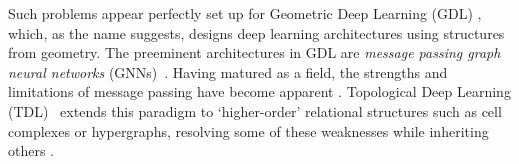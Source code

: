 \documentclass{article}
\newcommand{\jake}[1]{}
\newcommand{\kelly}[1]{}
\theoremstyle{remark}
\theoremstyle{plain}
\begin{document}

 Such problems appear perfectly set up for Geometric Deep Learning (GDL) \cite{bronstein2021geometric}, which, as the name suggests, designs deep learning architectures using structures from geometry. The preeminent architectures in GDL are \textit{message passing graph neural networks} (GNNs)~\cite{gilmer2017neural, battaglia2018relational, hamilton2018inductiverepresentationlearninglarge, thomas2019kpconv, xu2018how, velickovic2018graph, dwivedi2021generalizationtransformernetworksgraphs}. Having matured as a field, the strengths and limitations of message passing have become apparent \cite{garg2020generalizationrepresentationallimitsgraph}. Topological Deep Learning (TDL)~\cite{papamarkou2024position}  extends this paradigm to `higher-order' relational structures such as cell complexes or hypergraphs, resolving some of these weaknesses while inheriting others \cite{ebli2020simplicial,bunch2020simplicial,bodnar2021weisfeiler,roddenberry2021principled,feng2019hypergraph,bodnar2021cellular,hajij2022topological,bodnar2022neural,hume2025sheafification, papillon2025topotuneframeworkgeneralized}.

 
 
\end{document}

